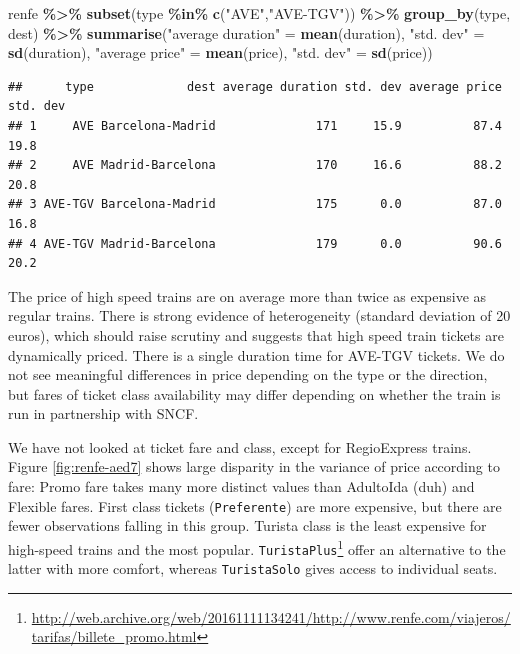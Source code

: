 \documentclass[
  11pt,
  letterpaper,
]{book}
\newenvironment{Shaded}{\begin{snugshade}}{\end{snugshade}}
\newcommand{\KeywordTok}[1]{\textcolor[rgb]{0.13,0.29,0.53}{\textbf{#1}}}
\newcommand{\NormalTok}[1]{#1}
\newcommand{\OperatorTok}[1]{\textcolor[rgb]{0.81,0.36,0.00}{\textbf{#1}}}
\newcommand{\StringTok}[1]{\textcolor[rgb]{0.31,0.60,0.02}{#1}}
\renewcommand{\href}[2]{#2\footnote{\url{#1}}}
\theoremstyle{definition}
\theoremstyle{definition}
\theoremstyle{definition}
\theoremstyle{remark}
\begin{document}
\begin{Shaded}
\begin{Highlighting}[]
\NormalTok{renfe }\OperatorTok{\%\textgreater{}\%}\StringTok{ }
\StringTok{  }\KeywordTok{subset}\NormalTok{(type }\OperatorTok{\%in\%}\StringTok{ }\KeywordTok{c}\NormalTok{(}\StringTok{"AVE"}\NormalTok{,}\StringTok{"AVE{-}TGV"}\NormalTok{)) }\OperatorTok{\%\textgreater{}\%}\StringTok{ }
\StringTok{  }\KeywordTok{group\_by}\NormalTok{(type, dest) }\OperatorTok{\%\textgreater{}\%}\StringTok{ }
\StringTok{  }\KeywordTok{summarise}\NormalTok{(}\StringTok{"average duration"}\NormalTok{ =}\StringTok{ }\KeywordTok{mean}\NormalTok{(duration), }
            \StringTok{"std. dev"}\NormalTok{ =}\StringTok{ }\KeywordTok{sd}\NormalTok{(duration),}
            \StringTok{"average price"}\NormalTok{ =}\StringTok{ }\KeywordTok{mean}\NormalTok{(price),}
            \StringTok{"std. dev"}\NormalTok{ =}\StringTok{ }\KeywordTok{sd}\NormalTok{(price))}
\end{Highlighting}
\end{Shaded}

\begin{verbatim}
##      type             dest average duration std. dev average price std. dev
## 1     AVE Barcelona-Madrid              171     15.9          87.4     19.8
## 2     AVE Madrid-Barcelona              170     16.6          88.2     20.8
## 3 AVE-TGV Barcelona-Madrid              175      0.0          87.0     16.8
## 4 AVE-TGV Madrid-Barcelona              179      0.0          90.6     20.2
\end{verbatim}

The price of high speed trains are on average more than twice as expensive as regular trains. There is strong evidence of heterogeneity (standard deviation of 20 euros), which should raise scrutiny and suggests that high speed train tickets are dynamically priced. There is a single duration time for AVE-TGV tickets. We do not see meaningful differences in price depending on the type or the direction, but fares of ticket class availability may differ depending on whether the train is run in partnership with SNCF.

We have not looked at ticket fare and class, except for RegioExpress trains. Figure \ref{fig:renfe-aed7} shows large disparity in the variance of price according to fare: Promo fare takes many more distinct values than AdultoIda (duh) and Flexible fares. First class tickets (\texttt{Preferente}) are more expensive, but there are fewer observations falling in this group. Turista class is the least expensive for high-speed trains and the most popular. \href{http://web.archive.org/web/20161111134241/http://www.renfe.com/viajeros/tarifas/billete_promo.html}{\texttt{TuristaPlus}} offer an alternative to the latter with more comfort, whereas \texttt{TuristaSolo} gives access to individual seats.
\end{document}
